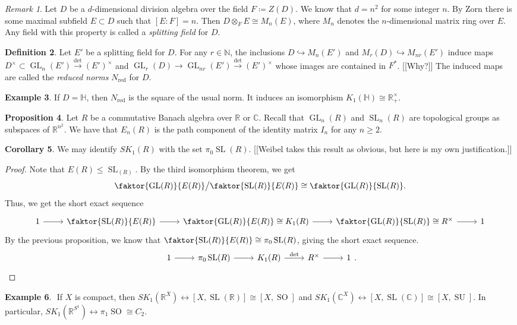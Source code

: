 \documentclass[10pt,letterpaper,cm]{nupset}
\theoremstyle{definition}
\newtheorem{definition}{Definition}
\newtheorem{exmp}[definition]{Example}
\theoremstyle{theorem}
\newtheorem{prop}[definition]{Proposition}
\newtheorem{corollary}[definition]{Corollary}
\theoremstyle{remark}
\newtheorem{remark}[definition]{Remark}
\newcommand{\C}{\mathbb C}
\renewcommand{\H}{\mathbb H}
\newcommand{\N}{\mathbb N}
\newcommand{\R}{\mathbb R}
\newcommand{\1}{\mathbf{1}}
\newcommand{\0}{\vec 0}
\DeclareMathOperator*{\GL}{GL}
\DeclareMathOperator*{\SL}{SL}
\DeclareMathOperator*{\SO}{SO}
\DeclareMathOperator*{\SU}{SU}
\DeclareMathOperator{\red}{red}
\begin{document}
\begin{remark}
Let $D$ be a $d$-dimensional division algebra over the field $F\coloneqq Z(D)$. We know that $d =n^2$ for some integer $n$. By Zorn there is some maximal subfield $E\subset D$ such that $[E : F] = n$. Then $D \otimes_F E \cong M_n(E)$, where $M_n$ denotes the $n$-dimensional matrix ring over $E$. Any field with this property is called a \textit{splitting field} for $D$.
\end{remark}

\begin{definition}
Let $E'$ be a splitting field for $D$. For any $r \in \N$, the inclusions $D \hookrightarrow M_n(E')$ and $M_r(D) \hookrightarrow M_{nr}(E')$ induce maps $D^{\times}\subset \GL_n(E') \overset{\det}{\longrightarrow} (E')^{\times}$ and $\GL_r(D)\to \GL_{nr}(E')  \overset{\det}{\longrightarrow} (E')^{\times}$ whose images are contained in $F^{\ast}$. {[[Why?]]} The induced maps are called the \textit{reduced norms} $N_{\red}$ for $D$.
\end{definition}

\begin{exmp}
If $D = \H$, then $N_{\red}$ is the square of the usual norm. It induces an isomorphism $K_1(\H) \cong \R_+^{\times}$.
\end{exmp}

\begin{prop}
Let $R$ be a commutative Banach algebra over $\R$ or $\C$. Recall that $\GL_n(R)$ and $\SL_n(R)$ are topological groups as subspaces of $\R^{n^2}$. We have that $E_n(R)$ is the path component of the identity matrix $I_n$ for any $n\geq 2$.
\end{prop}

\begin{corollary}
We may identify $SK_1(R)$ with the set $\pi_0\SL(R)$. {[[Weibel takes this result as obvious, but here is my own justification.]]}
\end{corollary}
\begin{proof}
Note that $E(R)\leq \SL_(R)$. By the third isomorphism theorem, we get $$ \faktor{\GL(R)}{E(R)}\big / \faktor{\SL(R)}{E(R)} \cong \faktor{\GL(R)}{\SL(R)}.$$ Thus, we get the short exact sequence 
\[
\begin{tikzcd}
1 \arrow[r] & \faktor{\SL(R)}{E(R)} \arrow[r] & \faktor{\GL(R)}{E(R)}\cong K_1(R) \arrow[r] & \faktor{\GL(R)}{\SL(R)} \cong R^{\times} \arrow[r] & 1
\end{tikzcd}
\]
By the previous proposition, we know that $\faktor{\SL(R)}{E(R)} \cong \pi_0\SL(R)$, giving the short exact sequence.
\[
\begin{tikzcd}
1 \arrow[r] & \pi_0\SL(R) \arrow[r] & K_1(R) \arrow[r, "\det"] & R^{\times} \arrow[r] & 1
\end{tikzcd}.
\]
\end{proof}
\begin{exmp} $ $
If $X$ is compact, then $SK_1(\R^X) \leftrightarrow [X, \SL(\R)] \cong [X, \SO]$ and $SK_1(\C^X) \leftrightarrow [X, \SL(\C)] \cong [X, \SU]$.
In particular, $SK_1(\R^{S^1}) \leftrightarrow \pi_1 \SO \cong C_2$.
\end{exmp}
\end{document}

